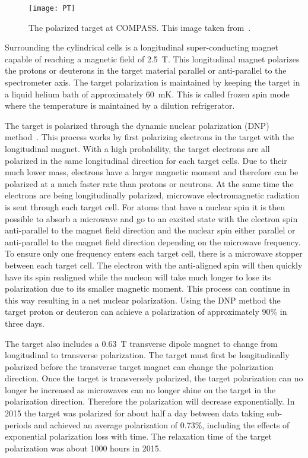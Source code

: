\begin{figure}[h!t]
  \centering
  \texttt{[image: PT]}
  \caption{The polarized target at COMPASS.  This image taken
    from~\cite{Matousek:2017rvj}.}
  \label{fig::PT}
\end{figure}

Surrounding the cylindrical cells is a longitudinal super-conducting magnet
capable of reaching a magnetic field of 2.5~T.  This longitudinal magnet
polarizes the protons or deuterons in the target material parallel or
anti-parallel to the spectrometer axis.  The target polarization is
maintained by keeping the target in a liquid helium bath of approximately 60~mK.
This is called frozen spin mode where the temperature is maintained by a
dilution refrigerator. \par

The target is polarized through the dynamic nuclear polarization (DNP)
method~\cite{DNPmethod}.  This process works by first polarizing electrons in
the target with the longitudinal magnet.  With a high probability, the target
electrons are all polarized in the same longitudinal direction for each target
cells.  Due to their much lower mass, electrons have a larger magnetic moment
and therefore can be polarized at a much faster rate than protons or neutrons.
At the same time the electrons are being longitudinally polarized, microwave
electromagnetic radiation is sent through each target cell.  For atoms that have
a nuclear spin it is then possible to absorb a microwave and go to an excited
state with the electron spin anti-parallel to the magnet field direction and the
nuclear spin either parallel or anti-parallel to the magnet field direction
depending on the microwave frequency.  To ensure only one frequency enters each
target cell, there is a microwave stopper between each target cell.  The
electron with the anti-aligned spin will then quickly have its spin realigned
while the nucleon will take much longer to lose its polarization due to its
smaller magnetic moment.  This process can continue in this way resulting in a
net nuclear polarization.  Using the DNP method the target proton or deuteron
can achieve a polarization of approximately 90\% in three days. \par

The target also includes a 0.63~T transverse dipole magnet to change from
longitudinal to transverse polarization.  The target must first be
longitudinally polarized before the transverse target magnet can change the
polarization direction.  Once the target is transversely polarized, the target
polarization can no longer be increased as microwaves can no longer shine on the
target in the polarization direction.  Therefore the polarization will decrease
exponentially.  In 2015 the target was polarized for about half a day between
data taking sub-periods and achieved an average polarization of 0.73\%,
including the effects of exponential polarization loss with time.  The
relaxation time of the target polarization was about 1000 hours in 2015. \par

